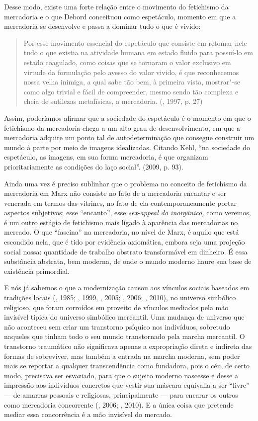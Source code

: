 Desse modo, existe uma forte relação entre o movimento do fetichismo da
mercadoria e o que Debord conceituou como espetáculo, momento em que a
mercadoria se desenvolve e passa a dominar tudo o que é vivido:

\begin{quote}
Por esse movimento essencial do espetáculo que consiste em retomar nele
tudo o que existia na atividade humana em estado fluido para possuí-lo
em estado coagulado, como coisas que se tornaram o valor exclusivo em
virtude da formulação pelo avesso do valor vivido, é que reconhecemos
nossa velha inimiga, a qual sabe tão bem, à primeira vista, mostrar"-se
como algo trivial e fácil de compreender, mesmo sendo tão complexa e
cheia de sutilezas metafísicas, a mercadoria. (, 1997, p. 27)
\end{quote}

Assim, poderíamos afirmar que a sociedade do espetáculo é o momento em
que o fetichismo da mercadoria chega a um alto grau de desenvolvimento,
em que a mercadoria adquire um ponto tal de autodeterminação que
consegue construir um mundo à parte por meio de imagens idealizadas.
Citando Kehl, ``na sociedade do espetáculo, as imagens, em sua forma
mercadoria, é que organizam prioritariamente as condições do laço
social''. (2009, p. 93).

Ainda uma vez é preciso sublinhar que o problema no conceito de
fetichismo da mercadoria em Marx não consiste no fato de a mercadoria
encantar e ser venerada em termos das vitrines, no fato de ela
contemporaneamente portar aspectos subjetivos; esse ``encanto'', esse
\emph{sex}-\emph{appeal do inorgânico,} como veremos, é um outro estágio
de fetichismo mais ligado à aparência das mercadorias no mercado. O que
``fascina'' na mercadoria, no nível de Marx, é aquilo que está escondido
nela, que é tido por evidência axiomática, embora seja uma projeção
social nossa: quantidade de trabalho abstrato transformável em dinheiro.
É essa substância abstrata, bem moderna, de onde o mundo moderno haure
sua base de existência primordial.

E nós já sabemos o que a modernização causou aos vínculos sociais
baseados em tradições locais (, 1985; , 1999, , 2005;
, 2006; , 2010), no universo simbólico religioso, que foram
corroídos em proveito de vínculos mediados pela mão invisível típica do
universo simbólico mercantil. Uma mudança de universo que não aconteceu
sem criar um transtorno psíquico nos indivíduos, sobretudo naqueles que
tinham todo o seu mundo transtornado pela marcha mercantil. O transtorno
traumático não significava apenas a expropriação direta e indireta das
formas de sobreviver, mas também a entrada na marcha moderna, sem poder
mais se reportar a qualquer transcendência como fundadora, pois o céu,
de certo modo, precisava ser esvaziado, para que o sujeito moderno
nascesse e desse a impressão aos indivíduos concretos que vestir sua
máscara equivalia a ser ``livre'' --- de amarras pessoais e religiosas,
principalmente --- para encarar os outros como mercadoria concorrente
(, 2006; , 2010). E a única coisa que pretende mediar essa
concorrência é a mão invisível do mercado.

